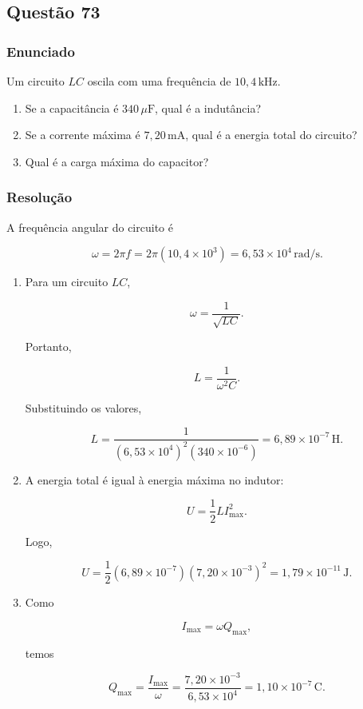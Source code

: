 \subsection{Questão 73}

\subsubsection{Enunciado}

Um circuito \(LC\) oscila com uma frequência de \(10{,}4\,\text{kHz}\).

\begin{enumerate}
    \item[(a)] Se a capacitância é \(340\,\mu\text{F}\), qual é a indutância?
    
    \item[(b)] Se a corrente máxima é \(7{,}20\,\text{mA}\), qual é a energia total do circuito?
    
    \item[(c)] Qual é a carga máxima do capacitor?
\end{enumerate}


\subsubsection{Resolução}

A frequência angular do circuito é

\[
\omega=2\pi f
=2\pi(10{,}4\times 10^3)
=6{,}53\times 10^4\,\text{rad/s}.
\]

\begin{enumerate}
    \item[(a)] Para um circuito \(LC\),

    \[
    \omega=\frac{1}{\sqrt{LC}}.
    \]

    Portanto,

    \[
    L=\frac{1}{\omega^2 C}.
    \]

    Substituindo os valores,

    \[
    L=
    \frac{1}{(6{,}53\times 10^4)^2(340\times 10^{-6})}
    =
    6{,}89\times 10^{-7}\,\text{H}.
    \]

    \item[(b)] A energia total é igual à energia máxima no indutor:

    \[
    U=\frac{1}{2}LI_{\max}^2.
    \]

    Logo,

    \[
    U=
    \frac{1}{2}(6{,}89\times 10^{-7})(7{,}20\times 10^{-3})^2
    =
    1{,}79\times 10^{-11}\,\text{J}.
    \]

    \item[(c)] Como

    \[
    I_{\max}=\omega Q_{\max},
    \]

    temos

    \[
    Q_{\max}=\frac{I_{\max}}{\omega}
    =
    \frac{7{,}20\times 10^{-3}}{6{,}53\times 10^4}
    =
    1{,}10\times 10^{-7}\,\text{C}.
    \]
\end{enumerate}

\vspace{1cm}
